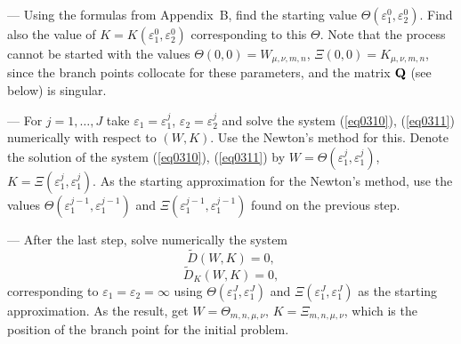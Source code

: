 \documentclass[12pt]{article}
\newcommand{\eps}{\varepsilon}
\begin{document}
\noindent 
--- Using the formulas from Appendix~B, find the starting value 
$\Theta(\eps_1^0 , \eps_2^0)$. 
Find also the value of $K = K (\eps_1^0 , \eps_2^0)$ corresponding to this $\Theta$. 
Note that the process cannot be started with the values 
$\Theta(0 , 0) = W_{\mu, \nu , m,n}$, $\Xi(0 , 0)= K_{\mu,\nu , m,n}$, since the branch points collocate for these parameters, 
and the matrix ${\bf Q}$ (see below) is singular.  

\noindent
--- 
For $j = 1, \dots, J$ take $\eps_1 = \eps_1^j$, $\eps_2 = \eps_2^j$ and solve the system 
(\ref{eq0310}), (\ref{eq0311}) numerically with respect to $(W, K)$.
Use the Newton's method for this. 
Denote the solution of the system (\ref{eq0310}), (\ref{eq0311})
by $W = \Theta(\eps_1^j , \eps_1^j ) $, 
$K = \Xi(\eps_1^j , \eps_1^j )$.
As the starting approximation for the Newton's 
method, use the values $\Theta (\eps_1^{j-1} , \eps_1^{j-1})$ and 
$\Xi (\eps_1^{j-1} , \eps_1^{j-1})$ found on the previous step. 

--- After the last step, solve numerically the system 
\begin{equation}
\tilde D (W,K)  = 0 , 
\label{eq0312}
\end{equation}
\begin{equation}
\tilde D_K (W,K)  = 0 , 
\label{eq0313}
\end{equation}
corresponding to $\eps_1 = \eps_2 = \infty$ using 
$\Theta (\eps_1^{J} , \eps_1^{J})$ and 
$\Xi (\eps_1^{J} , \eps_1^{J})$ as the starting approximation. 
As the result, get $W = \Theta_{m,n,\mu, \nu}$, 
$K = \Xi_{m,n,\mu, \nu}$, which is the position of the 
branch point for the initial problem. 
\end{document}
